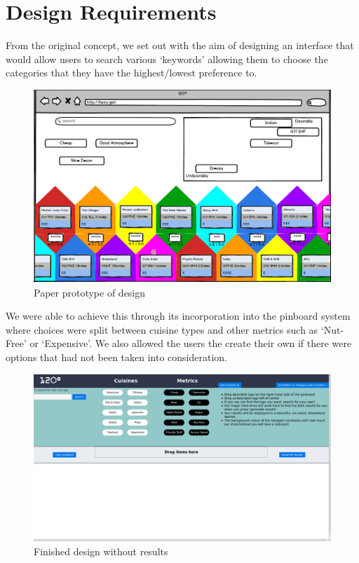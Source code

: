 \documentclass[10pt,a4paper]{article}
\begin{document}
\section*{Design Requirements}

From the original concept, we set out with the aim of designing an interface that would allow users to search various ‘keywords’ allowing them to choose the categories that they have the highest/lowest preference to.

\begin{figure}[H]
	\begin{center}
		\includegraphics[scale=0.37]{Screenshot.png}
		\caption{Paper prototype of design}
		\label{figure:prototype}
	\end{center}
\end{figure}


We were able to achieve this through its incorporation into the pinboard system where choices were split between cuisine types and other metrics such as ‘Nut-Free’ or ‘Expensive’. We also allowed the users the create their own if there were options that had not been taken into consideration.

\begin{figure}[H]
	\begin{center}
		\includegraphics[scale=0.2]{newScreenshot.png}
		\caption{Finished design without results}
		\label{figure:finished-design-no-results}
	\end{center}
\end{figure}
\end{document}
